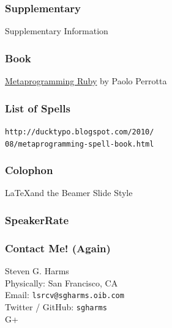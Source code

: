 \documentclass[slidestop,compress,mathserif]{beamer}
\begin{document}
\begin{frame}
	\frametitle{Supplementary}
	\begin{center}
		Supplementary Information
	\end{center}
\end{frame}

\begin{frame}
	\frametitle{Book}
	\underline{Metaprogramming Ruby} by Paolo Perrotta
\end{frame}

\begin{frame}
	\frametitle{List of Spells}
	\texttt{http://ducktypo.blogspot.com/2010/\\08/metaprogramming-spell-book.html}
\end{frame}

\begin{frame}
	\frametitle{Colophon}
	\LaTeX and the Beamer Slide Style
\end{frame}

\begin{frame}
	\frametitle{SpeakerRate}
	\vskip 1.25cm
\end{frame}

\begin{frame}
	\frametitle{Contact Me! (Again)}
	\begin{center}
		Steven G. Harms \\
		\vskip 1.25cm	
		Physically:  San Francisco, CA\\
		Email:  \texttt{lsrcv@sgharms.oib.com} \\
		Twitter / GitHub:  \texttt{sgharms} \\
		G+
	\end{center}
\end{frame}
\end{document}
